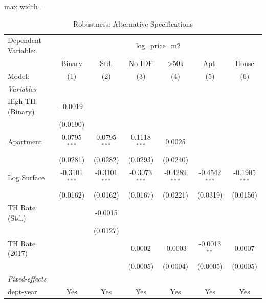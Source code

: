 \begin{table}[htbp]
   \caption{\label{tab:robustness} Robustness: Alternative Specifications}
   \centering
   \begin{adjustbox}{max width=\textwidth}
   \begin{tabular}{lcccccc}
      \tabularnewline \midrule \midrule
      Dependent Variable: & \multicolumn{6}{c}{log\_price\_m2}\\
                       & Binary          & Std.            & No IDF          & >50k            & Apt.            & House \\   
      Model:           & (1)             & (2)             & (3)             & (4)             & (5)             & (6)\\  
      \midrule
      \emph{Variables}\\
      High TH (Binary) & -0.0019         &                 &                 &                 &                 &   \\   
                       & (0.0190)        &                 &                 &                 &                 &   \\   
      Apartment        & 0.0795$^{***}$  & 0.0795$^{***}$  & 0.1118$^{***}$  & 0.0025          &                 &   \\   
                       & (0.0281)        & (0.0282)        & (0.0293)        & (0.0240)        &                 &   \\   
      Log Surface      & -0.3101$^{***}$ & -0.3101$^{***}$ & -0.3073$^{***}$ & -0.4289$^{***}$ & -0.4542$^{***}$ & -0.1905$^{***}$\\   
                       & (0.0162)        & (0.0162)        & (0.0167)        & (0.0221)        & (0.0319)        & (0.0156)\\   
      TH Rate (Std.)   &                 & -0.0015         &                 &                 &                 &   \\   
                       &                 & (0.0127)        &                 &                 &                 &   \\   
      TH Rate (2017)   &                 &                 & 0.0002          & -0.0003         & -0.0013$^{**}$  & 0.0007\\   
                       &                 &                 & (0.0005)        & (0.0004)        & (0.0005)        & (0.0005)\\   
      \midrule
      \emph{Fixed-effects}\\
      dept-year        & Yes             & Yes             & Yes             & Yes             & Yes             & Yes\\  

\end{tabular}
\end{adjustbox}
\end{table}
